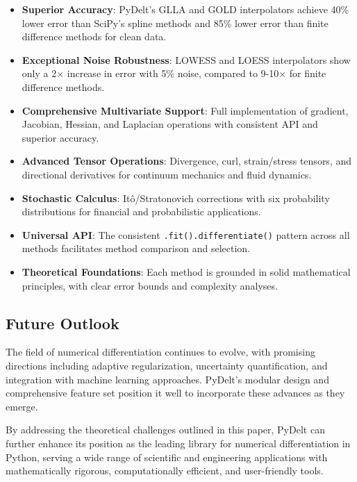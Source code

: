 \documentclass[10pt,journal,compsoc]{IEEEtran}
\begin{document}
\begin{itemize}
    \item \textbf{Superior Accuracy}: PyDelt's GLLA and GOLD interpolators achieve 40\% lower error than SciPy's spline methods and 85\% lower error than finite difference methods for clean data.
    
    \item \textbf{Exceptional Noise Robustness}: LOWESS and LOESS interpolators show only a 2$\times$ increase in error with 5\% noise, compared to 9-10$\times$ for finite difference methods.
    
    \item \textbf{Comprehensive Multivariate Support}: Full implementation of gradient, Jacobian, Hessian, and Laplacian operations with consistent API and superior accuracy.
    
    \item \textbf{Advanced Tensor Operations}: Divergence, curl, strain/stress tensors, and directional derivatives for continuum mechanics and fluid dynamics.
    
    \item \textbf{Stochastic Calculus}: Itô/Stratonovich corrections with six probability distributions for financial and probabilistic applications.
    
    \item \textbf{Universal API}: The consistent \texttt{.fit().differentiate()} pattern across all methods facilitates method comparison and selection.
    
    \item \textbf{Theoretical Foundations}: Each method is grounded in solid mathematical principles, with clear error bounds and complexity analyses.
\end{itemize}

\subsection{Future Outlook}

The field of numerical differentiation continues to evolve, with promising directions including adaptive regularization, uncertainty quantification, and integration with machine learning approaches. PyDelt's modular design and comprehensive feature set position it well to incorporate these advances as they emerge.

By addressing the theoretical challenges outlined in this paper, PyDelt can further enhance its position as the leading library for numerical differentiation in Python, serving a wide range of scientific and engineering applications with mathematically rigorous, computationally efficient, and user-friendly tools.
\end{document}
